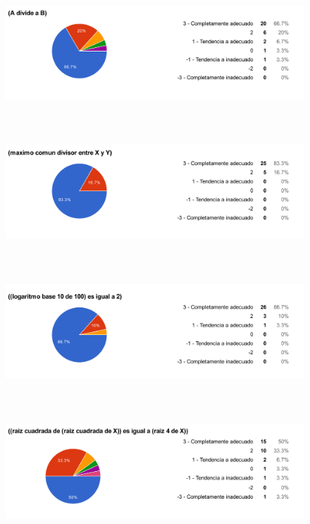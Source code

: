 \begin{figure}[H]
\centering
	\includegraphics[width=15cm, height=4.74cm]{Figures/hjudgement/r12}
	\caption[]{}
\label{fig:parsed_corpus}
\end{figure}

\begin{figure}[H]
\centering
	\includegraphics[width=15cm, height=4.74cm]{Figures/hjudgement/r13}
	\caption[]{}
\label{fig:parsed_corpus}
\end{figure}

\begin{figure}[H]
\centering
	\includegraphics[width=15cm, height=4.74cm]{Figures/hjudgement/r14}
	\caption[]{}
\label{fig:parsed_corpus}
\end{figure}

\begin{figure}[H]
\centering
	\includegraphics[width=15cm, height=4.74cm]{Figures/hjudgement/r15}
	\caption[]{}
\label{fig:parsed_corpus}
\end{figure}

